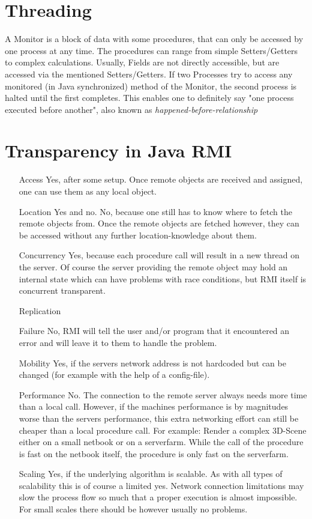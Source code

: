 \documentclass{tudexercise}
\begin{document}
	\section{Threading}
		A Monitor is a block of data with some procedures, that can only be accessed by one process at any time. The procedures can range from simple Setters/Getters to complex calculations. Usually, Fields are not directly accessible, but are accessed via the mentioned Setters/Getters.  
		If two Processes try to access any monitored (in Java synchronized) method of the Monitor, the second process is halted until the first completes. This enables one to definitely say "one process executed before another", also known as \textit{happened-before-relationship}
		
	\section{Transparency in Java RMI}
		\begin{itemize}
			\item[Access] Yes, after some setup. Once remote objects are received and assigned, one can use them as any local object.
			\item[Location] Yes and no. No, because one still has to know where to fetch the remote objects from. Once the remote objects are fetched however, they can be accessed without any further location-knowledge about them.
			\item[Concurrency] Yes, because each procedure call will result in a new thread on the server. Of course the server providing the remote object may hold an internal state which can have problems with race conditions, but RMI itself is concurrent transparent.
			\item[Replication] 
			\item[Failure] No, RMI will tell the user and/or program that it encountered an error and will leave it to them to handle the problem.
			\item[Mobility] Yes, if the servers network address is not hardcoded but can be changed (for example with the help of a config-file).
			\item[Performance] No. The connection to the remote server always needs more time than a local call. However, if the machines performance is by magnitudes worse than the servers performance, this extra networking effort can still be cheaper than a local procedure call. For example: Render a complex 3D-Scene either on a small netbook or on a serverfarm. While the call of the procedure is fast on the netbook itself, the procedure is only fast on the serverfarm.
			\item[Scaling] Yes, if the underlying algorithm is scalable. As with all types of scalability this is of course a limited yes. Network connection limitations may slow the process flow so much that a proper execution is almost impossible. For small scales there should be however usually no problems.
		\end{itemize}
		
\end{document}
